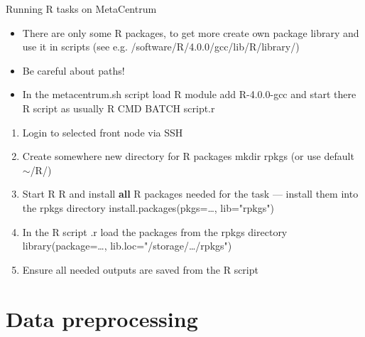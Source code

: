 \documentclass[compress, ucs, xelatex, 11pt, xcolor=x11names, aspectratio=169,
	hyperref={
		bookmarks=true,
		unicode=true,
		colorlinks=true,
		pdftitle={HybSeq course},
		plainpages=false,
		pdfauthor={Vojtech Zeisek},
		pdfsubject={Practical processing of HybSeq target enrichment sequencing data on computing grids like MetaCentrum},
		pdfcreator={XeLaTeX},
		pdfkeywords={BASH, command line, GNU, HybSeq, Linux, MetaCentrum, sequencing shell, target enrichment},
		linkcolor=Turquoise4, %
		anchorcolor=DodgerBlue4, %
		citecolor=DodgerBlue4, %
		filecolor=DodgerBlue4, %
		menucolor=Tan4, %
		urlcolor=DarkOliveGreen4, %
		pdftex},
	url={hyphens, lowtilde} %
	]{beamer}
\renewcommand{\texttt}[1]{\colorbox{Cornsilk2}{{\ttfamily #1}}}
\renewcommand{\alert}[1]{\textcolor{OrangeRed3}{#1}}
\begin{document}
\begin{frame}{Running R tasks on MetaCentrum}
	\begin{itemize}
		\item There are only some R packages, to get more create own package library and use it in scripts (see e.g. \texttt{/software/R/4.0.0/gcc/lib/R/library/})
		\item \alert{Be careful about paths!}
		\item In the \texttt{metacentrum.sh} script load R \texttt{module add R-4.0.0-gcc} and start there R script as usually \texttt{R CMD BATCH script.r}
	\end{itemize}
	\begin{enumerate}
		\item Login to selected front node via SSH
		\item Create somewhere new directory for R packages \texttt{mkdir rpkgs} (or use default \texttt{$\sim$/R/})
		\item Start R \texttt{R} and install \textbf{all} R packages needed for the task --- install them into the \texttt{rpkgs} directory \texttt{install.packages(pkgs=\ldots, lib="rpkgs")}
		\item In the R script \texttt{*.r} load the packages from the \texttt{rpkgs} directory \texttt{library(package=\ldots, lib.loc="/storage/\ldots/rpkgs")}
		\item Ensure all needed outputs are saved from the R script
	\end{enumerate}
\end{frame}

\section{Data preprocessing}
\end{document}

